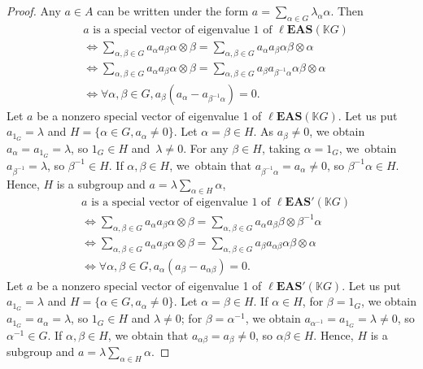 \documentclass[pdftex]{sigma}
\numberwithin{equation}{section}
\newcommand{\leas}{\ell\mathbf{EAS}}
\begin{document}
\begin{proof}
Any $a\in A$ can be written under the form $ a=\sum_{\alpha \in G} \lambda_\alpha \alpha$. Then
\begin{align*}
&a\text{ is a special vector of eigenvalue 1 of }\leas(\mathbb{K} G)\\
&\Longleftrightarrow \sum_{\alpha,\beta \in G} a_\alpha a_\beta \alpha \otimes \beta=\sum_{\alpha,\beta\in G}a_\alpha a_\beta \alpha \beta \otimes \alpha\\
&\Longleftrightarrow\sum_{\alpha,\beta \in G} a_\alpha a_\beta \alpha \otimes \beta=\sum_{\alpha,\beta\in G}a_\beta a_{\beta^{-1}\alpha} \alpha \beta \otimes \alpha\\
&\Longleftrightarrow\forall \alpha,\beta \in G, a_\beta(a_\alpha-a_{\beta^{-1}\alpha})=0.
\end{align*}
Let $a$ be a nonzero special vector of eigenvalue 1 of $\leas(\mathbb{K} G)$. Let us put $a_{1_G}=\lambda$ and $H=\{\alpha \in G, a_\alpha \neq 0\}$. Let $\alpha=\beta \in H$.
As $a_\beta\neq 0$, we obtain $a_\alpha=a_{1_G}=\lambda$, so $1_G\in H$ and~${\lambda \neq 0}$. For any $\beta \in H$, taking $\alpha=1_G$, we~obtain $a_{\beta^{-1}}=\lambda$, so $\beta^{-1}\in H$.
If $\alpha,\beta \in H$, we~obtain that $a_{\beta^{-1}\alpha}=a_\alpha\neq 0$, so $\beta^{-1}\alpha \in H$. Hence, $H$ is a subgroup and $ a=\lambda \sum_{\alpha \in H}\alpha$,
\begin{align*}
&a\text{ is a special vector of eigenvalue 1 of }\leas'(\mathbb{K} G)\\
&\Longleftrightarrow \sum_{\alpha,\beta \in G} a_\alpha a_\beta \alpha \otimes \beta=\sum_{\alpha,\beta\in G}a_\alpha a_\beta \beta \otimes \beta^{-1}\alpha\\
&\Longleftrightarrow\sum_{\alpha,\beta \in G} a_\alpha a_\beta \alpha \otimes \beta=\sum_{\alpha,\beta\in G}a_\beta a_{\alpha\beta} \alpha \beta \otimes \alpha\\
&\Longleftrightarrow\forall \alpha,\beta \in G, a_\alpha(a_\beta-a_{\alpha\beta})=0.
\end{align*}
Let $a$ be a nonzero special vector of eigenvalue 1 of $\leas'(\mathbb{K} G)$. Let us put $a_{1_G}=\lambda$ and $H=\{\alpha \in G, a_\alpha \neq 0\}$. Let $\alpha=\beta \in H$.
If $\alpha \in H$, for $\beta=1_G$, we obtain $a_{1_G}=a_\alpha=\lambda$, so $1_G\in H$ and $\lambda \neq 0$; for $\beta=\alpha^{-1}$, we obtain $a_{\alpha^{-1}}=a_{1_G}=\lambda\neq 0$, so $\alpha^{-1}\in G$.
If $\alpha,\beta \in H$, we obtain that $a_{\alpha\beta}=a_\beta\neq 0$, so $\alpha \beta\in H$. Hence, $H$ is a subgroup and $ a=\lambda \sum_{\alpha \in H}\alpha$.


\end{proof}
\end{document}
